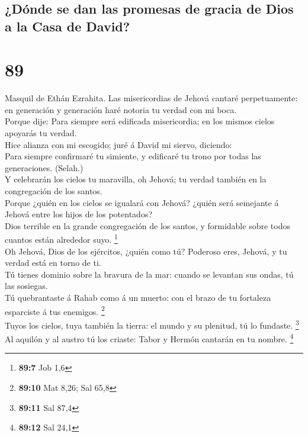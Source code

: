 \hypertarget{duxf3nde-se-dan-las-promesas-de-gracia-de-dios-a-la-casa-de-david}{%
\subsection{¿Dónde se dan las promesas de gracia de Dios a la Casa de
David?}\label{duxf3nde-se-dan-las-promesas-de-gracia-de-dios-a-la-casa-de-david}}

\hypertarget{section-88}{%
\section{89}\label{section-88}}

 Masquil de Ethán Ezrahita. Las misericordias de Jehová
cantaré perpetuamente: en generación y generación haré notoria tu verdad
con mi boca.\\
 Porque dije: Para siempre será edificada misericordia; en
los mismos cielos apoyarás tu verdad.\\
 Hice alianza con mi escogido; juré á David mi siervo,
diciendo:\\
 Para siempre confirmaré tu simiente, y edificaré tu trono
por todas las generaciones. (Selah.)\\
 Y celebrarán los cielos tu maravilla, oh Jehová; tu verdad
también en la congregación de los santos.\\
 Porque ¿quién en los cielos se igualará con Jehová? ¿quién
será semejante á Jehová entre los hijos de los potentados?\\
 Dios terrible en la grande congregación de los santos, y
formidable sobre todos cuantos están alrededor suyo. \footnote{\textbf{89:7}
  Job 1,6}\\
 Oh Jehová, Dios de los ejércitos, ¿quién como tú? Poderoso
eres, Jehová, y tu verdad está en torno de ti.\\
 Tú tienes dominio sobre la bravura de la mar: cuando se
levantan sus ondas, tú las sosiegas.\\
 Tú quebrantaste á Rahab como á un muerto: con el brazo de
tu fortaleza esparciste á tus enemigos. \footnote{\textbf{89:10} Mat
  8,26; Sal 65,8}\\
 Tuyos los cielos, tuya también la tierra: el mundo y su
plenitud, tú lo fundaste. \footnote{\textbf{89:11} Sal 87,4}\\
 Al aquilón y al austro tú los criaste: Tabor y Hermón
cantarán en tu nombre. \footnote{\textbf{89:12} Sal 24,1}\\
